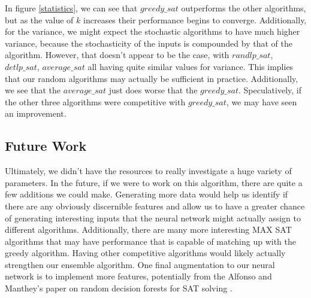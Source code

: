 \documentclass[paper=a4, fontsize=11pt]{scrartcl} %
\numberwithin{equation}{section} %
\numberwithin{figure}{section} %
\numberwithin{table}{section} %
\begin{document}
In figure \ref{statistics}, we can see that $greedy\_sat$ outperforms the other algorithms, but as the value of $k$ increases their performance begins to converge.  Additionally, for the variance, we might expect the stochastic algorithms to have much higher variance, because the stochasticity of the inputs is compounded by that of the algorithm.  However, that doesn't appear to be the case, with $randlp\_sat$, $detlp\_sat$, $average\_sat$ all having quite similar values for variance.  This implies that our random algorithms may actually be sufficient in practice.  Additionally, we see that the $average\_sat$ just does worse that the $greedy\_sat$.  Speculatively, if the other three algorithms were competitive with $greedy\_sat$, we may have seen an improvement.

\subsection{Future Work}

Ultimately, we didn't have the resources to really investigate a huge variety of parameters.  In the future, if we were to work on this algorithm, there are quite a few additions we could make.  Generating more data would help us identify if there are any obviously discernible features and allow us to have a greater chance of generating interesting inputs that the neural network might actually assign to different algorithms.   Additionally, there are many more interesting MAX SAT algorithms that may have performance that is capable of matching up with the greedy algorithm.  Having other competitive algorithms would likely actually strengthen our ensemble algorithm.  One final augmentation to our neural network is to implement more features, potentially from the Alfonso and Manthey's paper on random decision forests for SAT solving \cite{POS-14:New_CNF_Features_and_Formula_Classification}.


\nocite{*}
 

\end{document}
